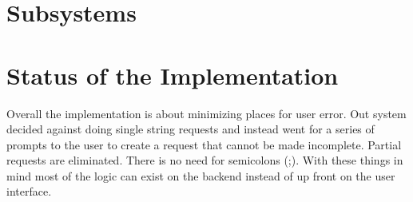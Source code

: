 \documentclass[12pt]{report}
\begin{document}
    \begin{center}
    \end{center}


    \newpage
    \section*{Subsystems}\label{sec:subsystems}
    

    \section*{Status of the Implementation}\label{sec:statusOfTheImplementation}

    \indent
    Overall the implementation is about minimizing places for user error.
    Out system decided against doing single string requests and instead went for a series of prompts to the user to create a request that cannot be made incomplete.
    Partial requests are eliminated.
    There is no need for semicolons (;).
    With these things in mind most of the logic can exist on the backend instead of up front on the user interface.
\end{document}
